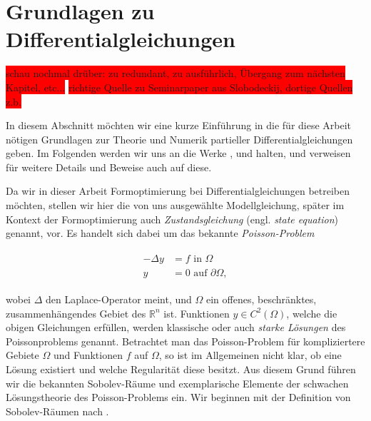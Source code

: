 
\section{Grundlagen zu Differentialgleichungen}\label{Chapter_grundlagenpde}



\colorbox{red}{schau nochmal drüber: zu redundant, zu ausführlich, Übergang zum nächsten Kapitel, etc...}
\colorbox{red}{richtige Quelle zu Seminarpaper aus Slobodeckij, dortige Quellen z.b.}

In diesem Abschnitt möchten wir eine kurze Einführung in die für diese Arbeit nötigen Grundlagen zur Theorie und Numerik partieller Differentialgleichungen geben. Im Folgenden werden wir uns an die Werke \cite{PDE1}, \cite{PDE2} und \cite{PDE3} halten, und verweisen für weitere Details und Beweise auch auf diese.

Da wir in dieser Arbeit Formoptimierung bei Differentialgleichungen betreiben möchten, stellen wir hier die von uns ausgewählte Modellgleichung, später im Kontext der Formoptimierung auch \textit{Zustandsgleichung} (engl. \textit{state equation}) genannt, vor. Es handelt sich dabei um das bekannte \textit{Poisson-Problem}

\begin{align}\label{Poissonproblem}
	\begin{aligned}
	-\Delta y &=  f  \text{ in } \Omega \; \\ y &= 0 \text{ auf } \partial \Omega,
	\end{aligned}
\end{align}

wobei $\Delta$ den Laplace-Operator meint, und $\Omega$ ein offenes, beschränktes, zusammenhängendes Gebiet des $\mathbb{R}^n$ ist. Funktionen $y\in C^2(\Omega)$, welche die obigen Gleichungen erfüllen, werden klassische oder auch \textit{starke Lösungen} des Poissonproblems genannt. Betrachtet man das Poisson-Problem für kompliziertere Gebiete $\Omega$ und Funktionen $f$ auf $\Omega$, so ist im Allgemeinen nicht klar, ob eine Lösung existiert und welche Regularität diese besitzt. Aus diesem Grund führen wir die bekannten Sobolev-Räume und exemplarische Elemente der schwachen Lösungstheorie des Poisson-Problems ein. Wir beginnen mit der Definition von Sobolev-Räumen nach \cite{PDE3}.

